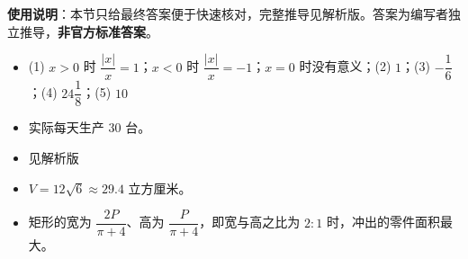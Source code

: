 
\begin{gknotice}
\textbf{使用说明}：本节只给最终答案便于快速核对，完整推导见解析版。答案为编写者独立推导，\textbf{非官方标准答案}。
\end{gknotice}

\begin{itemize}[leftmargin=2.6em]
  \item[\textbf{1.}] (1) $x>0$ 时 $\dfrac{|x|}{x}=1$；$x<0$ 时 $\dfrac{|x|}{x}=-1$；$x=0$ 时没有意义；(2) $1$；(3) $-\dfrac16$；(4) $24\dfrac18$；(5) $10$
  \item[\textbf{2.}] 实际每天生产 $30$ 台。
  \item[\textbf{3.}] 见解析版
  \item[\textbf{4.}] $V=12\sqrt6\approx29.4$ 立方厘米。
  \item[\textbf{5.}] 矩形的宽为 $\dfrac{2P}{\pi+4}$、高为 $\dfrac{P}{\pi+4}$，即宽与高之比为 $2:1$ 时，冲出的零件面积最大。
\end{itemize}
